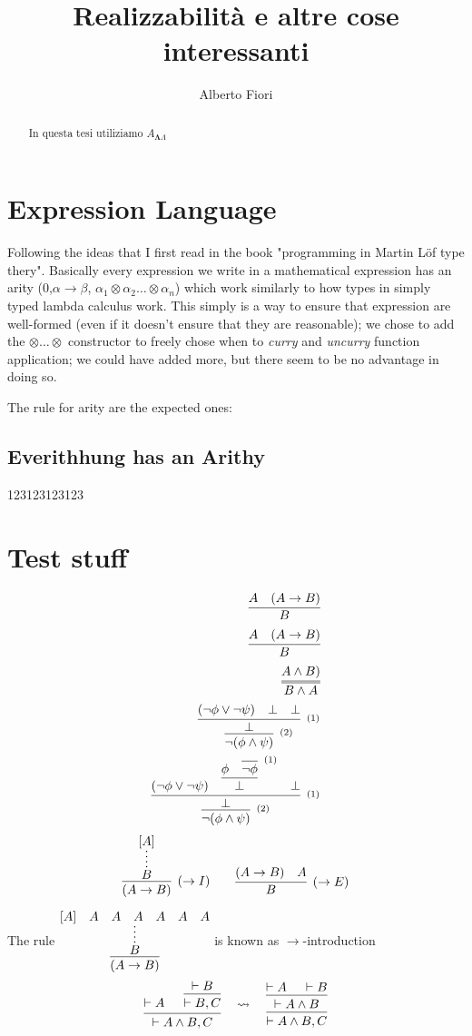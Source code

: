 \documentclass[11pt,a5paper,draft,oneside]{report}
\author{Alberto Fiori}
\title{Realizzabilità e altre cose interessanti}
\begin{document}
\begin{abstract}
In questa tesi utiliziamo $A_{\bm{\Lambda}\Lambda}$
\end{abstract}

\chapter{Expression Language}
	Following the ideas that I first read in the book "programming in Martin Löf type thery". Basically every expression we write in a mathematical expression has an arity (0,$\alpha\rightarrow\beta$, $\alpha_1\otimes\alpha_2\ldots\otimes\alpha_n$) which work similarly to how types in simply typed lambda calculus work. 
	This simply is a way to ensure that expression are well-formed (even if it doesn't ensure that they are reasonable); we chose to add the $\otimes\ldots\otimes$ constructor to freely chose when to \emph{curry} and \emph{uncurry} function application; we could have added more, but there seem to be no advantage in doing so.
	
	The rule for arity are the expected ones:
	
	
	\section{Everithhung has an Arithy} 
		123123123123

\chapter{Test stuff}
	\begin{eqnarray}
		\infer{B}{A & (A \rightarrow B)}	\\
		\infer{B}{A & (A \rightarrow B)}	\\
		\infer={B \land A}{A \land B)}		\\
		\infer[^{(2)}]
     {\neg(\phi \land \psi)}
     {\infer[^{(1)}]
        {\bot}
        {(\neg\phi \lor \neg\psi) & \bot & \bot}
     }
     \\
     \infer[^{(2)}]
     {\neg(\phi \land \psi)}
     {\infer[^{(1)}]
        {\bot}
        {(\neg\phi \lor \neg\psi) & 
        \infer
            {\bot}
            {\phi & 
            \infer[^{(1)}]
            {\neg\phi}{}
            } 
        & \bot}
     }\\     
	\end{eqnarray}
$$
\infer[(\to I)]
     {(A \to B)}
     {
     \infer*{B}{[A]}
     }
\qquad
\infer[(\to E)]
     {B}
     {(A \to B) & A}
$$



The rule 
$\vcenter
{
\infer
    {(A \to B)}
    {
    \infer*{B}{[A] & A & A & A & A & A & A}
    }
}$
is known as $\to$-introduction
\newpage
\[
\begin{prooftree}
\Hypo{ \vdash A }
\Hypo{ \vdash B } \Infer1{ \vdash B, C }
\Infer2{ \vdash A\wedge B, C }
\end{prooftree}
%
\quad \rightsquigarrow \quad
\begin{prooftree}
\Hypo{ \vdash A } \Hypo{ \vdash B }
\Infer2{ \vdash A\wedge B }
\Infer1{ \vdash A\wedge B, C }
\end{prooftree}
\]
\end{document}
